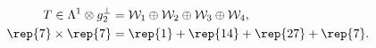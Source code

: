 \begin{equation}
\begin{aligned}
   T \in \Lambda^1 \otimes g_2^\perp 
      &= \mathcal{W}_1 \oplus \mathcal{W}_2 \oplus \mathcal{W}_3
         \oplus \mathcal{W}_4 , \\
   \rep{7} \times \rep{7} 
      &= \rep{1}  + \rep{14} + \rep{27}+ \rep{7} .
\end{aligned}
\end{equation}

